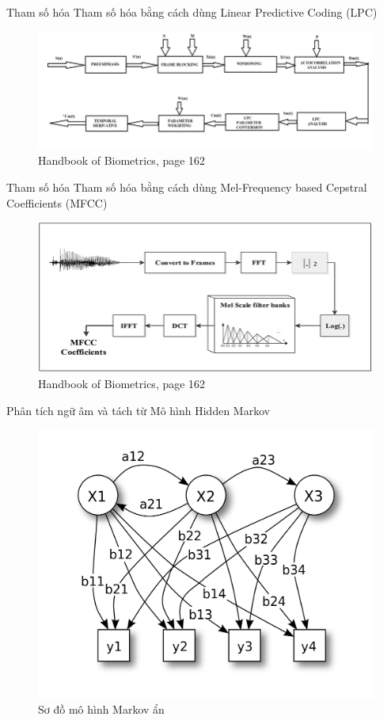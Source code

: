 \documentclass[notheorems, aspectratio=54]{beamer}
\begin{document}
\begin{frame}{Tham số hóa}
	Tham số hóa bằng cách dùng Linear Predictive Coding (LPC)
	\begin{figure}[h!]
		\includegraphics[width=0.9\linewidth]{images/Block-diagram-of-LPC-Linear-Predictive-Coding.png}
		\caption{Handbook of Biometrics, page 162}
		\label{fig:writing-thesis}
	\end{figure}
\end{frame}
\begin{frame}{Tham số hóa}
	Tham số hóa bằng cách dùng Mel-Frequency based Cepstral Coefficients (MFCC)
	\begin{figure}[H]
		\includegraphics[width=0.9\linewidth]{images/Extraction-Mel-frequency-cepstral-coefficients-MFCC-from-the-audio-recording-signals.png}
		\caption{Handbook of Biometrics, page 162}
		\label{fig:writing-thesis}
	\end{figure}
\end{frame}
\begin{frame}{Phân tích ngữ âm và tách từ}
	Mô hình Hidden Markov
	\begin{figure}[h!]
		\includegraphics[width=0.6\linewidth]{images/1024px-HiddenMarkovModel.svg.png}
		\caption{Sơ đồ mô hình Markov ẩn}
		\label{fig:writing-thesis}
	\end{figure}
	
\end{frame}
\end{document}
